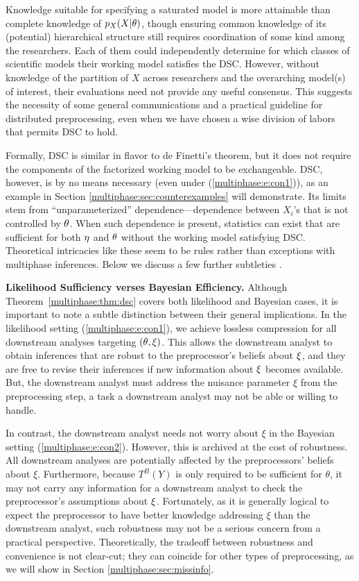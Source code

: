 Knowledge suitable for specifying a saturated model is more attainable than complete knowledge of $p_X(X | \theta)$,  though ensuring common knowledge of its (potential) hierarchical structure  still requires coordination of some kind among the researchers.
Each of them could independently determine for which classes of scientific models their working model satisfies the DSC.
However, without knowledge of the partition of $X$ across researchers and the overarching model(s) of interest, their evaluations need not provide  any useful consensus.
This suggests the necessity of some general communications and a practical guideline for distributed preprocessing, even when we have chosen a wise  division of labors that permits DSC to hold.

Formally, DSC is similar in flavor to de Finetti's theorem, but it does not require the components of the factorized working model to be exchangeable. 
DSC, however, is by no means necessary (even under (\ref{multiphase:e:con1})), as an example in Section \ref{multiphase:sec:counterexamples} will demonstrate.
Its limits stem from ``unparameterized'' dependence---dependence between $X_i$'s that is not controlled by $\theta$.
When such dependence is present, statistics can exist that are sufficient for both $\eta$ and $\theta$ without the working model satisfying DSC.
Theoretical intricacies like these seem to be rules rather than exceptions with multiphase inferences.
Below we discuss a few further subtleties . 
  
\medskip
\noindent
{\bf Likelihood Sufficiency verses Bayesian Efficiency.}
Although Theorem~\ref{multiphase:thm:dsc} covers both likelihood and Bayesian cases, it is important to note a subtle distinction between their general implications.
 In the likelihood setting (\ref{multiphase:e:con1}), we achieve lossless compression for all downstream analyses targeting $(\theta, \xi)$.
 This allows the downstream analyst to obtain inferences that are robust to the preprocessor's beliefs about $\xi$, and they are free to revise their inferences if new information about $\xi$ becomes available.
But, the downstream analyst must address the nuisance parameter $\xi$ from the preprocessing step, a task a downstream analyst may not be able or willing to handle.

In contrast, the downstream analyst needs not worry about $\xi$ in the Bayesian setting (\ref{multiphase:e:con2}).
However, this is archived at the cost of robustness.
All downstream analyses are potentially affected by the preprocessors' beliefs about $\xi$.
Furthermore, because $T^B(Y)$ is only required to be sufficient for $\theta$,  it may not carry any information for a downstream analyst to check the preprocessor's assumptions about $\xi$.
Fortunately, as it is generally logical to expect the preprocessor to have better knowledge addressing $\xi$ than the downstream analyst, such robustness may not be a serious concern from a practical perspective.
Theoretically, the tradeoff between robustness and convenience is not clear-cut; they can coincide for other types of preprocessing, as we will show in Section \ref{multiphase:sec:missinfo}.

